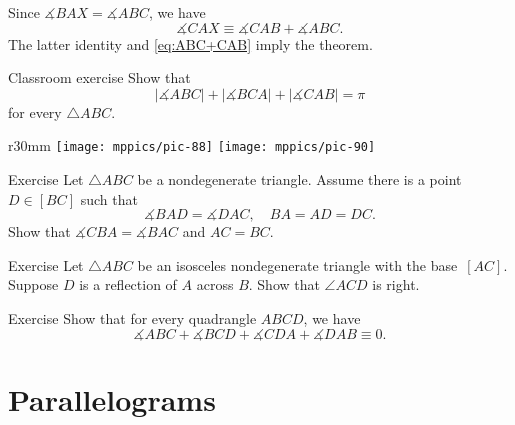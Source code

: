 Since $\measuredangle BAX=\measuredangle ABC$,
we have 
\[\measuredangle CAX\equiv\measuredangle CAB+\measuredangle ABC.\]
The latter identity and \ref{eq:ABC+CAB} imply the theorem.\qeds

\begin{thm}[!]{Classroom exercise}\label{ex:|3sum|}
Show that 
$$|\measuredangle A B C|+ |\measuredangle B C A| + |\measuredangle C A B| = \pi$$
for every $\triangle ABC$.
\end{thm} 

{

\begin{wrapfigure}{r}{30mm}
\vskip-0mm
\centering
\texttt{[image: mppics/pic-88]}
\vskip4mm
\texttt{[image: mppics/pic-90]}
\end{wrapfigure}

\begin{thm}{Exercise}\label{ex:pent}
Let $\triangle ABC$ be a nondegenerate triangle.
Assume there is a point $D\in [BC]$ 
such that 
\[\measuredangle BAD=\measuredangle DAC,
\quad
BA=AD=DC.\]
Show that $\measuredangle CBA= \measuredangle BAC$ and $AC=BC$.
\end{thm}


\begin{thm}{Exercise}\label{ex:right-isos}
Let $\triangle ABC$ be an isosceles nondegenerate triangle with the base~$[AC]$.
Suppose $D$ is a reflection of $A$ across $B$.
Show that $\angle ACD$ is right.
\end{thm}




}

\begin{thm}[!]{Exercise}\label{ex:quadrangle}
Show that for every quadrangle $ABCD$, we have
$$\measuredangle ABC+\measuredangle BCD+\measuredangle CDA+\measuredangle DAB\equiv 0.$$

\end{thm}


\section{Parallelograms}

